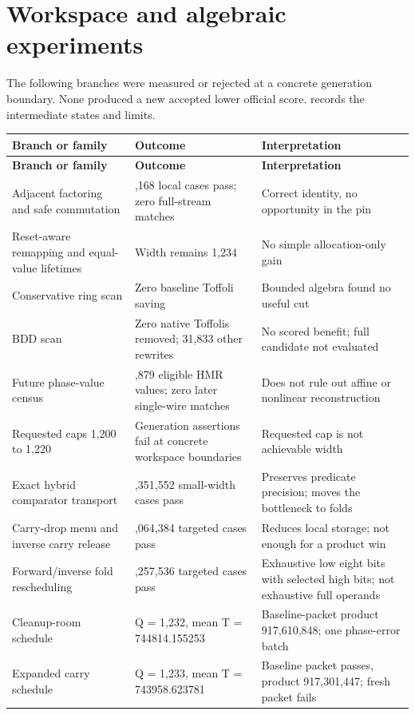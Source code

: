 \documentclass[11pt,letterpaper]{article}
\begin{document}
\section{Workspace and algebraic experiments}

The following branches were measured or rejected at a concrete generation boundary. None produced a new accepted lower official score.  records the intermediate states and limits.


{\small
\setlength{\tabcolsep}{5pt}
\renewcommand{\arraystretch}{1.18}
\begin{longtable}{>{\raggedright\arraybackslash}p{2.822in}>{\raggedright\arraybackslash}p{1.529in}>{\raggedright\arraybackslash}p{1.529in}}
\toprule
\textbf{Branch or family} & \textbf{Outcome} & \textbf{Interpretation} \\
\midrule
\endfirsthead
\toprule
\textbf{Branch or family} & \textbf{Outcome} & \textbf{Interpretation} \\
\midrule
\endhead
Adjacent factoring and safe commutation & 23,168 local cases pass; zero full-stream matches & Correct identity, no opportunity in the pin \\
Reset-aware remapping and equal-value lifetimes & Width remains 1,234 & No simple allocation-only gain \\
Conservative ring scan & Zero baseline Toffoli saving & Bounded algebra found no useful cut \\
BDD scan & Zero native Toffolis removed; 31,833 other rewrites & No scored benefit; full candidate not evaluated \\
Future phase-value census & 4,879 eligible HMR values; zero later single-wire matches & Does not rule out affine or nonlinear reconstruction \\
Requested caps 1,200 to 1,220 & Generation assertions fail at concrete workspace boundaries & Requested cap is not achievable width \\
Exact hybrid comparator transport & 3,351,552 small-width cases pass & Preserves predicate precision; moves the bottleneck to folds \\
Carry-drop menu and inverse carry release & 2,064,384 targeted cases pass & Reduces local storage; not enough for a product win \\
Forward/inverse fold rescheduling & 8,257,536 targeted cases pass & Exhaustive low eight bits with selected high bits; not exhaustive full operands \\
Cleanup-room schedule & Q = 1,232, mean T = 744814.155253 & Baseline-packet product 917,610,848; one phase-error batch \\
Expanded carry schedule & Q = 1,233, mean T = 743958.623781 & Baseline packet passes, product 917,301,447; fresh packet fails \\
\bottomrule
\end{longtable}
}
\end{document}
